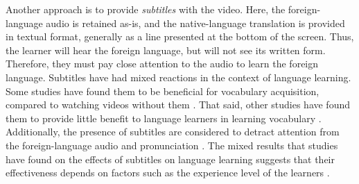 \documentclass{sigchi}
\begin{document}
Another approach is to provide \emph{subtitles} with the video. Here, the foreign-language audio is retained as-is, and the native-language translation is provided in textual format, generally as a line presented at the bottom of the screen.
Thus, the learner will hear the foreign language, but will not see its written form. Therefore, they must pay close attention to the audio
to learn the foreign language.
Subtitles have had mixed reactions in the context of language learning. Some studies have found them to be beneficial for vocabulary acquisition, compared to watching videos without them \cite{danan2004captioning}.
That said, other studies have found them to provide little benefit to language learners in learning vocabulary \cite{danan1992reversed}. Additionally, the presence of subtitles are considered to detract attention from the foreign-language audio and pronunciation \cite{mitterer2009foreign}.
The mixed results that studies have found on the effects of subtitles on language learning suggests that their effectiveness depends on factors such as the experience level of the learners \cite{bianchi2008captions}.
\end{document}
